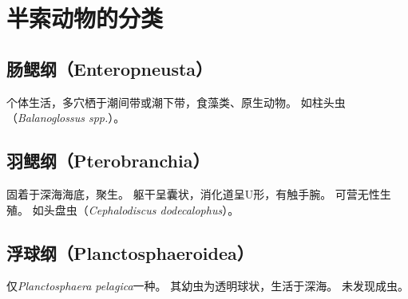 \documentclass[11pt]{article}
\begin{document}
\section{半索动物的分类}
\subsection{肠鳃纲（Enteropneusta）}
个体生活，多穴栖于潮间带或潮下带，食藻类、原生动物。
如柱头虫（\textit{Balanoglossus spp.}）。

\subsection{羽鳃纲（Pterobranchia）}
固着于深海海底，聚生。
躯干呈囊状，消化道呈U形，有触手腕。
可营无性生殖。
如头盘虫（\textit{Cephalodiscus dodecalophus}）。

\subsection{浮球纲（Planctosphaeroidea）}
仅\textit{Planctosphaera pelagica}一种。
其幼虫为透明球状，生活于深海。
未发现成虫。
\end{document}
